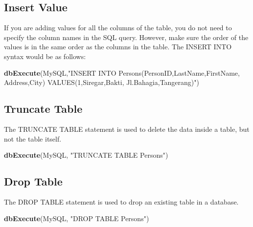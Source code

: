 \documentclass[
]{book}
\newenvironment{Shaded}{\begin{snugshade}}{\end{snugshade}}
\newcommand{\FunctionTok}[1]{\textcolor[rgb]{0.13,0.29,0.53}{\textbf{#1}}}
\newcommand{\NormalTok}[1]{#1}
\newcommand{\StringTok}[1]{\textcolor[rgb]{0.31,0.60,0.02}{#1}}
\begin{document}
\hypertarget{insert-value}{%
\subsection{Insert Value}\label{insert-value}}

If you are adding values for all the columns of the table, you do not need to specify the column names in the SQL query. However, make sure the order of the values is in the same order as the columns in the table. The INSERT INTO syntax would be as follows:

\begin{Shaded}
\begin{Highlighting}[]
\FunctionTok{dbExecute}\NormalTok{(MySQL,}\StringTok{"INSERT INTO Persons(PersonID,LastName,FirstName, Address,City)}
\StringTok{                 VALUES(1,\textquotesingle{}Siregar\textquotesingle{},\textquotesingle{}Bakti\textquotesingle{}, \textquotesingle{}Jl.Bahagia\textquotesingle{},\textquotesingle{}Tangerang\textquotesingle{})"}\NormalTok{)}
\end{Highlighting}
\end{Shaded}

\hypertarget{truncate-table}{%
\subsection{Truncate Table}\label{truncate-table}}

The TRUNCATE TABLE statement is used to delete the data inside a table, but not the table itself.

\begin{Shaded}
\begin{Highlighting}[]
\FunctionTok{dbExecute}\NormalTok{(MySQL, }\StringTok{"TRUNCATE TABLE Persons"}\NormalTok{)}
\end{Highlighting}
\end{Shaded}

\hypertarget{drop-table}{%
\subsection{Drop Table}\label{drop-table}}

The DROP TABLE statement is used to drop an existing table in a database.

\begin{Shaded}
\begin{Highlighting}[]
\FunctionTok{dbExecute}\NormalTok{(MySQL, }\StringTok{"DROP TABLE Persons"}\NormalTok{)}
\end{Highlighting}
\end{Shaded}
\end{document}
